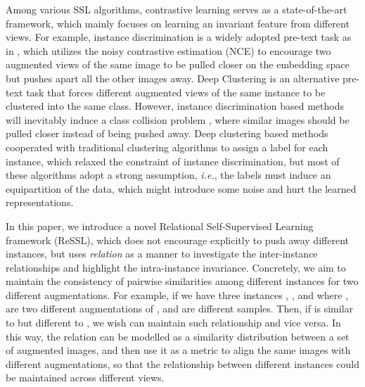 \documentclass{article}
\newcommand{\<}{\left\langle}
\renewcommand{\>}{\right\rangle}
\newcommand{\ie}{{\emph{i.e.}}}
\begin{document}
Among various SSL algorithms, contrastive learning \cite{instance_discrimination, alignment_uniformity, simclr} serves as a state-of-the-art framework, which mainly focuses on learning an invariant feature from different views. For example, instance discrimination is a widely adopted pre-text task as in \cite{simclr, moco, instance_discrimination},  which utilizes the noisy contrastive estimation (NCE) to encourage two augmented views of the same image to be pulled closer on the embedding space but pushes apart all the other images away. Deep Clustering \cite{deepclustering, Self-labelling, swav} is an alternative pre-text task that forces different augmented views of the same instance to be clustered into the same class. However, instance discrimination based methods will inevitably induce a class collision problem \cite{contrastive_theory, PCL, debiased},  where similar images should be pulled closer instead of being pushed away. Deep clustering based methods cooperated with traditional clustering algorithms to assign a label for each instance, which relaxed the constraint of instance discrimination, but most of these algorithms adopt a strong assumption, \ie, the labels must induce an equipartition of the data, which might introduce some noise and hurt the learned representations.




In this paper, we introduce a novel Relational Self-Supervised Learning framework (ReSSL), which does not encourage explicitly to push away different instances, but uses \textit{relation} as a manner to investigate the inter-instance relationships and highlight the intra-instance invariance. Concretely, we aim to maintain the consistency of pairwise similarities among different instances for two different augmentations. For example, if we have three instances  , ,  and  where ,  are two different augmentations of ,   and  are different samples. Then, if  is similar to  but different to , we wish  can maintain such relationship and vice versa. In this way, the relation can be modelled as a similarity distribution between a set of augmented images, and then use it as a metric to align the same images with different augmentations, so that the relationship between different instances could be maintained across different views. 
\end{document}
